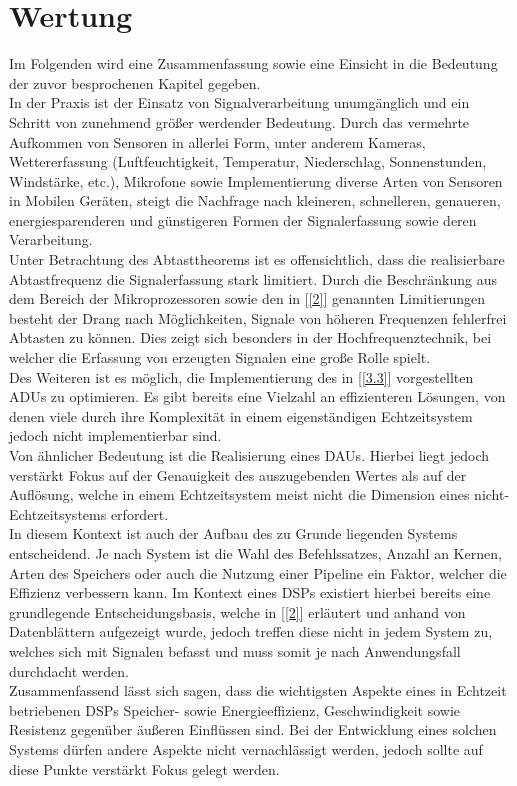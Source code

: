 \section{Wertung}
Im Folgenden wird eine Zusammenfassung sowie eine Einsicht in die Bedeutung der zuvor besprochenen Kapitel gegeben.\\

In der Praxis ist der Einsatz von Signalverarbeitung unumgänglich und ein Schritt von zunehmend größer werdender Bedeutung. Durch das vermehrte Aufkommen von Sensoren in allerlei Form, unter anderem Kameras, Wettererfassung (Luftfeuchtigkeit, Temperatur, Niederschlag, Sonnenstunden, Windstärke, etc.), Mikrofone sowie Implementierung diverse Arten von Sensoren in Mobilen Geräten, steigt die Nachfrage nach kleineren, schnelleren, genaueren, energiesparenderen und günstigeren Formen der Signalerfassung sowie deren Verarbeitung.\\
Unter Betrachtung des Abtasttheorems ist es offensichtlich, dass die realisierbare Abtastfrequenz die Signalerfassung stark limitiert. Durch die Beschränkung aus dem Bereich der Mikroprozessoren sowie den in [\ref{2}] genannten Limitierungen besteht der Drang nach Möglichkeiten, Signale von höheren Frequenzen fehlerfrei Abtasten zu können. Dies zeigt sich besonders in der Hochfrequenztechnik, bei welcher die Erfassung von erzeugten Signalen eine große Rolle spielt.\\
Des Weiteren ist es möglich, die Implementierung des in [\ref{3.3}] vorgestellten ADUs zu optimieren. Es gibt bereits eine Vielzahl an effizienteren Lösungen, von denen viele durch ihre Komplexität in einem eigenständigen Echtzeitsystem jedoch nicht implementierbar sind.\\
Von ähnlicher Bedeutung ist die Realisierung eines DAUs. Hierbei liegt jedoch verstärkt Fokus auf der Genauigkeit des auszugebenden Wertes als auf der Auflösung, welche in einem Echtzeitsystem meist nicht die Dimension eines nicht-Echtzeitsystems erfordert.\\
In diesem Kontext ist auch der Aufbau des zu Grunde liegenden Systems entscheidend. Je nach System ist die Wahl des Befehlssatzes, Anzahl an Kernen, Arten des Speichers oder auch die Nutzung einer Pipeline ein Faktor, welcher die Effizienz verbessern kann. Im Kontext eines DSPs existiert hierbei bereits eine grundlegende Entscheidungsbasis, welche in [\ref{2}] erläutert und anhand von Datenblättern aufgezeigt wurde, jedoch treffen diese nicht in jedem System zu, welches sich mit Signalen befasst und muss somit je nach Anwendungsfall durchdacht werden.\\

Zusammenfassend lässt sich sagen, dass die wichtigsten Aspekte eines in Echtzeit betriebenen DSPs Speicher- sowie Energieeffizienz, Geschwindigkeit sowie Resistenz gegenüber äußeren Einflüssen sind. Bei der Entwicklung eines solchen Systems dürfen andere Aspekte nicht vernachlässigt werden, jedoch sollte auf diese Punkte verstärkt Fokus gelegt werden.